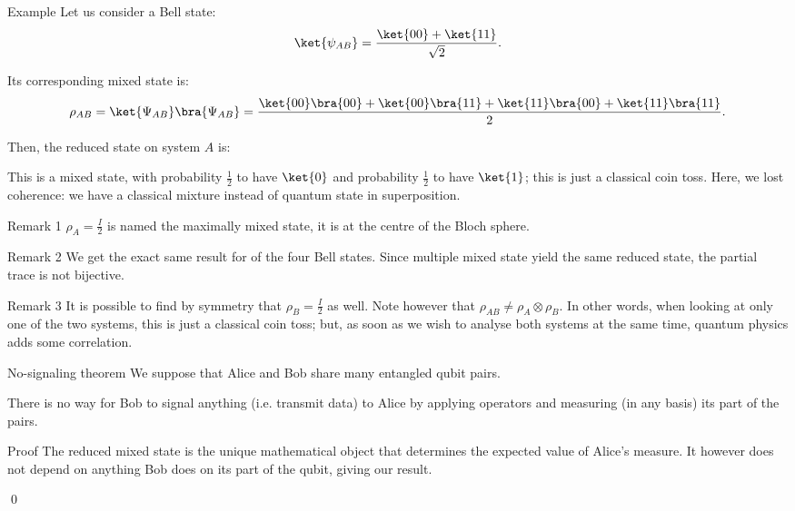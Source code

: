 \documentclass[a4paper]{article}
\begin{document}
\begin{parag}{Example}
    Let us consider a Bell state: 
    \[\ket{\psi_{AB}} = \frac{\ket{00} + \ket{11}}{\sqrt{2}}.\]

    Its corresponding mixed state is: 
    \[\rho_{AB} = \ket{\Psi_{AB}}\bra{\Psi_{AB}} = \frac{\ket{00}\bra{00} + \ket{00}\bra{11} + \ket{11}\bra{00} + \ket{11}\bra{11}}{2}.\]

    Then, the reduced state on system $A$ is: 

    This is a mixed state, with probability $\frac{1}{2}$ to have $\ket{0}$ and probability $\frac{1}{2}$ to have $\ket{1}$; this is just a classical coin toss. Here, we lost coherence: we have a classical mixture instead of quantum state in superposition.

    \begin{subparag}{Remark 1}
        $\rho_A = \frac{I}{2}$ is named the maximally mixed state, it is at the centre of the Bloch sphere.
    \end{subparag}

    \begin{subparag}{Remark 2}
        We get the exact same result for of the four Bell states. Since multiple mixed state yield the same reduced state, the partial trace is not bijective.
    \end{subparag}

    \begin{subparag}{Remark 3}
        It is possible to find by symmetry that $\rho_B = \frac{I}{2}$ as well. Note however that $\rho_{AB} \neq \rho_A \otimes \rho_B$. In other words, when looking at only one of the two systems, this is just a classical coin toss; but, as soon as we wish to analyse both systems at the same time, quantum physics adds some correlation.
    \end{subparag}
\end{parag}

\begin{parag}{No-signaling theorem}
    We suppose that Alice and Bob share many entangled qubit pairs. 

    There is no way for Bob to signal anything (i.e. transmit data) to Alice by applying operators and measuring (in any basis) its part of the pairs.

    \begin{subparag}{Proof}
        The reduced mixed state is the unique mathematical object that determines the expected value of Alice's measure. It however does not depend on anything Bob does on its part of the qubit, giving our result.

        \qed
    \end{subparag}
\end{parag}
\end{document}
